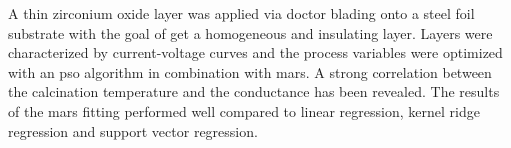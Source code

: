 A thin zirconium oxide layer was applied via doctor blading onto a steel foil substrate with the goal of get a homogeneous and insulating layer.
Layers were characterized by current-voltage curves and the process variables were optimized with an \gls{pso} algorithm in combination with \gls{mars}.
A strong correlation between the calcination temperature and the conductance has been revealed. 
The results of the \gls{mars} fitting performed well compared to linear regression, kernel ridge regression and support vector regression.
